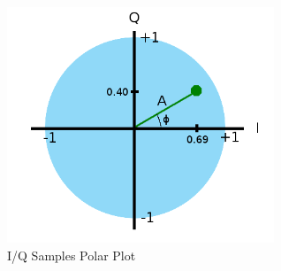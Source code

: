 \documentclass[runningheads,a4paper]{llncs}
\begin{document}
%
\begin{figure}[here]
	\centering
	\includegraphics[width=8cm]{images/47}
	\caption{I/Q Samples Polar Plot \citep{kuisma-14}}
	\label{fig:kuisma-iq-polar}
\end{figure}
%
\end{document}
